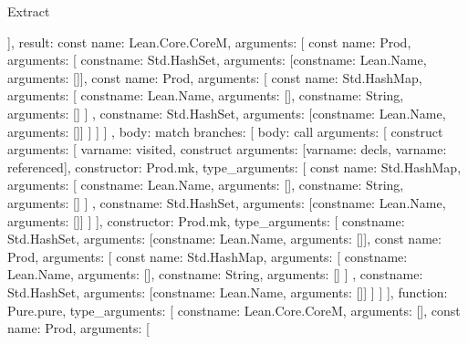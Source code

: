 \begin{lexlean}{Extract}
\begin{toolingmodule}
{{{        }
      ],
      result: const{
        name: Lean.Core.CoreM,
        arguments: [
          const{
            name: Prod,
            arguments: [
              const{name: Std.HashSet, arguments: [const{name: Lean.Name, arguments: []}]},
              const{
                name: Prod,
                arguments: [
                  const{
                    name: Std.HashMap,
                    arguments: [
                      const{name: Lean.Name, arguments: []},
                      const{name: String, arguments: []}
                    ]
                  },
                  const{name: Std.HashSet, arguments: [const{name: Lean.Name, arguments: []}]}
                ]
              }
            ]
          }
        ]
      },
      body: match{
        branches: [
          {
            body: call{
              arguments: [
                construct{
                  arguments: [
                    var{name: visited},
                    construct{
                      arguments: [var{name: decls}, var{name: referenced}],
                      constructor: Prod.mk,
                      type_arguments: [
                        const{
                          name: Std.HashMap,
                          arguments: [
                            const{name: Lean.Name, arguments: []},
                            const{name: String, arguments: []}
                          ]
                        },
                        const{name: Std.HashSet, arguments: [const{name: Lean.Name, arguments: []}]}
                      ]
                    }
                  ],
                  constructor: Prod.mk,
                  type_arguments: [
                    const{name: Std.HashSet, arguments: [const{name: Lean.Name, arguments: []}]},
                    const{
                      name: Prod,
                      arguments: [
                        const{
                          name: Std.HashMap,
                          arguments: [
                            const{name: Lean.Name, arguments: []},
                            const{name: String, arguments: []}
                          ]
                        },
                        const{name: Std.HashSet, arguments: [const{name: Lean.Name, arguments: []}]}
                      ]
                    }
                  ]
                }
              ],
              function: Pure.pure,
              type_arguments: [
                const{name: Lean.Core.CoreM, arguments: []},
                const{
                  name: Prod,
                  arguments: [
}}}}}}
\end{toolingmodule}
\end{lexlean}
